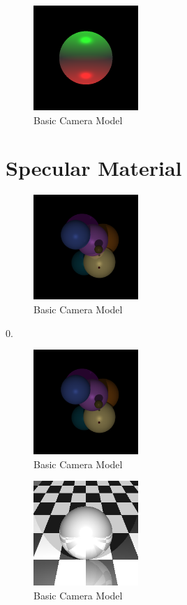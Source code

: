 \documentclass{article}
\begin{document}
\begin{figure}[H]
  \begin{center}
  \includegraphics[width=150px]{Images/pointLight.png}
  \caption{Basic Camera Model}
  \label{fig:basiccammod}
  \end{center}
\end{figure}

\section{Specular Material}

\begin{figure}[H]
  \begin{center}
  \includegraphics[width=150px]{Images/reflectionsOn.png}
  \caption{Basic Camera Model}
  \label{fig:basiccammod}
  \end{center}
\end{figure}
0.
\begin{figure}[H]
  \begin{center}
  \includegraphics[width=150px]{Images/reflectionsOff.png}
  \caption{Basic Camera Model}
  \label{fig:basiccammod}
  \end{center}
\end{figure}

\begin{figure}[H]
  \begin{center}
  \includegraphics[width=150px]{Images/gridSphere.png}
  \caption{Basic Camera Model}
  \label{fig:basiccammod}
  \end{center}
\end{figure}
\end{document}
